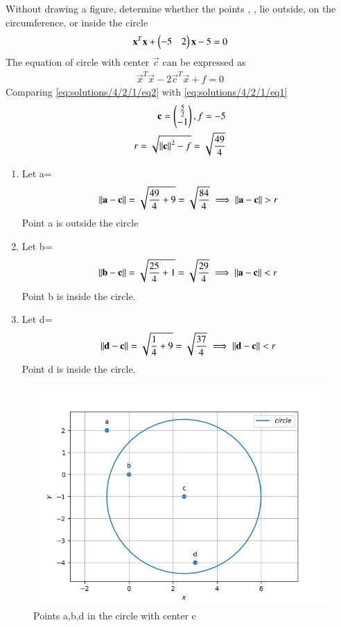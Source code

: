 Without drawing a figure, determine whether
the points  ,  ,   lie outside, on the
circumference, or inside the circle
\begin{align}
    \mathbf{x}^T\mathbf{x}+ \begin{pmatrix}-5 & 2\end{pmatrix}\mathbf{x}-5 = 0 \label{eq:solutions/4/2/1/eq1}
\end{align}
The equation of circle with center $\vec{c}$ can be expressed as
\begin{align}
    \vec{x}^T\vec{x}-2\vec{c}^T\vec{x}+f = 0 \label{eq:solutions/4/2/1/eq2}
\end{align}
Comparing \eqref{eq:solutions/4/2/1/eq2} with \eqref{eq:solutions/4/2/1/eq1}
\begin{align}
\mathbf{c}=\begin{pmatrix}\frac{5}{2} \\ -1\end{pmatrix},f=-5 \\
 r=\sqrt{\left\lVert\mathbf{c}\right\rVert^2-f} = \sqrt{\frac{49}{4}}
\end{align}
\begin{enumerate}
\item
Let a= 
\begin{align}
\left\lVert\mathbf{a-c}\right\rVert=\sqrt{\frac{49}{4}+9}=\sqrt{\frac{84}{4}}
\implies \left\lVert\mathbf{a-c}\right\rVert>r 
\end{align}
Point a is outside the circle
\item
Let b= 
\begin{align}
\left\lVert\mathbf{b-c}\right\rVert=\sqrt{\frac{25}{4}+1}=\sqrt{\frac{29}{4}}
\implies \left\lVert\mathbf{a-c}\right\rVert<r 
\end{align}
Point b is inside the circle.
\item
Let d= 
\begin{align}
\left\lVert\mathbf{d-c}\right\rVert=\sqrt{\frac{1}{4}+9}=\sqrt{\frac{37}{4}}
\implies \left\lVert\mathbf{d-c}\right\rVert<r 
\end{align}
Point d is inside the circle.
\end{enumerate}
\begin{figure}[!ht]
\centering
\includegraphics[width=\columnwidth]{./solutions/4/2/1/assign4}
\caption{Points a,b,d in the circle with center c}
\label{eq:solutions/4/2/1/Fig:1}
\end{figure}


